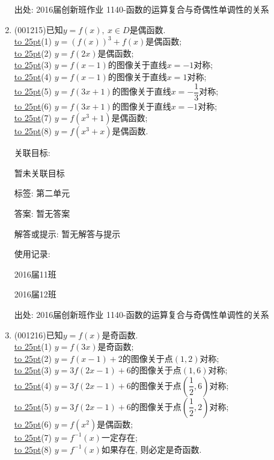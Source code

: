 \documentclass[10pt,a4paper]{article}
\newcommand{\blank}[1]{\underline{\hbox to #1pt{}}}
\begin{document}
\begin{enumerate}[1.]
出处: 2016届创新班作业	1140-函数的运算复合与奇偶性单调性的关系
\item { (001215)}已知$y=f(x), \ x \in D$是偶函数.\\ 
\blank{25}(1) $y=(f(x))^3+f(x)$是偶函数;\\ 
\blank{25}(2) $y=f(2x)$是偶函数;\\ 
\blank{25}(3) $y=f(x-1)$的图像关于直线$x=-1$对称;\\ 
\blank{25}(4) $y=f(x-1)$的图像关于直线$x=1$对称;\\ 
\blank{25}(5) $y=f(3x+1)$的图像关于直线$x=-\dfrac{1}{3}$对称;\\ 
\blank{25}(6) $y=f(3x+1)$的图像关于直线$x=-1$对称;\\ 
\blank{25}(7) $y=f(x^3+1)$是偶函数;\\ 
\blank{25}(8) $y=f(x^3+x)$是偶函数.


关联目标:

暂未关联目标



标签: 第二单元

答案: 暂无答案

解答或提示: 暂无解答与提示

使用记录:

2016届11班								

2016届12班								


出处: 2016届创新班作业	1140-函数的运算复合与奇偶性单调性的关系
\item { (001216)}已知$y=f(x)$是奇函数.\\ 
\blank{25}(1) $y=f(3x)$是奇函数;\\ 
\blank{25}(2) $y=f(x-1)+2$的图像关于点$(1,2)$对称;\\ 
\blank{25}(3) $y=3f(2x-1)+6$的图像关于点$(1,6)$对称;\\ 
\blank{25}(4) $y=3f(2x-1)+6$的图像关于点$(\dfrac{1}{2},6)$对称;\\ 
\blank{25}(5) $y=3f(2x-1)+6$的图像关于点$(\dfrac{1}{2},2)$对称;\\ 
\blank{25}(6) $y=f(x^2)$是偶函数;\\ 
\blank{25}(7) $y=f^{-1}(x)$一定存在;\\ 
\blank{25}(8) $y=f^{-1}(x)$如果存在, 则必定是奇函数.



\end{enumerate}
\end{document}

